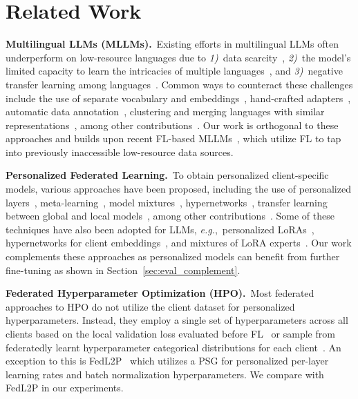 \section{Related Work}\label{sec:related}

\noindent\textbf{Multilingual LLMs (MLLMs).}~Existing efforts in multilingual LLMs often underperform on low-resource languages due to \textit{1)}~data scarcity~\cite{xu2024survey}, \textit{2)}~the model's limited capacity to learn the intricacies of multiple languages~\cite{conneau-etal-2020-unsupervised}, and \textit{3)}~negative transfer learning among languages~\cite{wang2020negative}.
Common ways to counteract these challenges include the use of separate vocabulary and embeddings~\cite{artetxe2020cross}, hand-crafted adapters~\cite{pfeiffer2020mad}, automatic data annotation~\cite{llama3}, clustering and merging languages with similar representations~\cite{chung2020improving}, among other contributions~\cite{wang2020extending,Conneau2019UnsupervisedCR}. Our work is orthogonal to these approaches and builds upon recent FL-based MLLMs~\cite{zhao2023breaking,DEPT,fedllm-bench}, which utilize FL to tap into previously inaccessible low-resource data sources.

\noindent\textbf{Personalized Federated Learning.}~To obtain personalized client-specific models, various approaches have been proposed, including the use of personalized layers~\cite{fedper}, meta-learning~\cite{fedmeta}, model mixtures~\cite{fedem}, hypernetworks~\cite{pfedhn}, transfer learning between global and local models~\cite{fml}, among other contributions~\cite{apfl}. Some of these techniques have also been adopted for LLMs, \textit{e.g.},~personalized LoRAs~\cite{FedDPA}, hypernetworks for client embeddings~\cite{FedPerC}, and mixtures of LoRA experts~\cite{FedAMoLE}. Our work complements these approaches as personalized models can benefit from further fine-tuning as shown in Section~\ref{sec:eval_complement}.

\noindent\textbf{Federated Hyperparameter Optimization (HPO).}~Most federated approaches to HPO do not utilize the client dataset for personalized hyperparameters. Instead, they employ a single set of hyperparameters across all clients based on the local validation loss evaluated before FL~\cite{flora,holly2022evaluation} or sample from federatedly learnt hyperparameter categorical distributions for each client~\cite{fedex}. An exception to this is FedL2P~\cite{royson2023fedl2p} which utilizes a PSG for personalized per-layer learning rates and batch normalization hyperparameters. We compare with FedL2P in our experiments.

